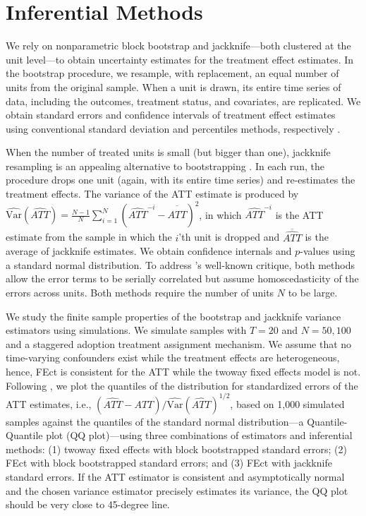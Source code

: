 \documentclass[12pt]{article}
\begin{document}
\section{Inferential Methods}

We rely on nonparametric block bootstrap and jackknife---both clustered at the unit level---to obtain uncertainty estimates for the treatment effect estimates. In the bootstrap procedure, we resample, with replacement, an equal number of units from the original sample. When a unit is drawn, its entire time series of data, including the outcomes, treatment status, and covariates, are replicated.  We obtain standard errors and confidence intervals of treatment effect estimates using conventional standard deviation and percentiles methods, respectively \citep{Efron1993}.

When the number of treated units is small (but bigger than one), jackknife resampling is an appealing alternative to bootstrapping \citep{miller1974, efron1981}. In each run, the procedure drops one unit (again, with its entire time series) and re-estimates the treatment effects. The variance of the ATT estimate is produced by $\widehat{\mathrm{Var}}(\widehat{ATT}) = \frac{N-1}{N}\sum_{i = 1}^{N} (\widehat{ATT}^{-i} - \overline{\widehat{ATT}})^{2}$, in which $\widehat{ATT}^{-i}$ is the ATT estimate from the sample in which the $i$'th unit is dropped and $\overline{\widehat{ATT}}$ is the average of jackknife estimates. We obtain confidence internals and $p$-values using a standard normal distribution. To address \citet{howmuch2004}'s well-known critique, both methods allow the error terms to be serially correlated but assume homoscedasticity of the errors across units. Both methods require the number of units $N$ to be large. 

We study the finite sample properties of the bootstrap and jackknife variance estimators using simulations. We simulate samples with $T = 20$ and $N = 50, 100$ and a staggered adoption treatment assignment mechanism. We assume that no time-varying confounders exist while the treatment effects are heterogeneous, hence, FEct is consistent for the ATT while the twoway fixed effects model is not. Following \citet{Arkhangelsky2019-lz}, we plot the quantiles of the distribution for standardized errors of the ATT estimates, i.e., $(\widehat{ATT} - ATT)/\widehat{\mathrm{Var}}(\widehat{ATT})^{1/2}$, based on 1,000 simulated samples against the quantiles of the standard normal distribution---a Quantile-Quantile plot (QQ plot)---using three combinations of estimators and inferential methods: (1) twoway fixed effects with block bootstrapped standard errors; (2) FEct with block bootstrapped standard errors; and (3) FEct with jackknife standard errors. If the ATT estimator is consistent and asymptotically normal and the chosen variance estimator precisely estimates its variance, the QQ plot should be very close to 45-degree line. 
\end{document}
